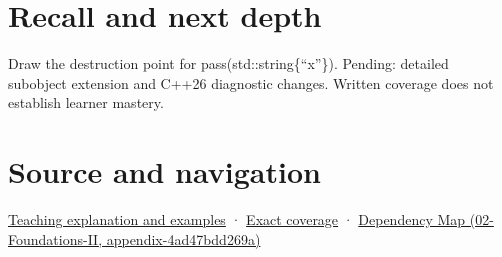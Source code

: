 \section{Recall and next depth}\label{appendix-a978b29bbbb0-recall-and-next-depth}

Draw the destruction point for pass(std::string\{``x''\}). Pending: detailed subobject extension and C++26 diagnostic changes. Written coverage does not establish learner mastery.

\section{Source and navigation}\label{appendix-a978b29bbbb0-source-and-navigation}

\href{Continuous\%20Notes/Computing\%20Foundations\%20-\%20From\%20Bits\%20to\%20C++\%20and\%20Systems\%20APIs\#A\%20temporary\%20needs\%20an\%20explicit\%20lifetime\%20story}{Teaching explanation and examples} · \hyperref[appendix-fd090d982a15-m008---parts-113-126]{Exact coverage} · \href{../02-Foundations-II/main.pdf\#nameddest=appendix-4ad47bdd269a}{Dependency Map (02-Foundations-II, appendix-4ad47bdd269a)}
